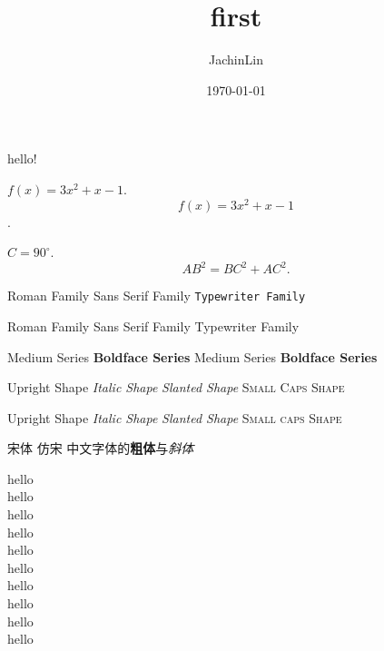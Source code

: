 \documentclass[12pt]{article} %
\title{\heiti first}
\author{\kaishu JachinLin}	%
\date{\today}
\newcommand{\degree}{^\circ}	%
\begin{document}
	\maketitle
	hello!	%

	$ f(x)=3x^2 + x - 1 $.
	$$ f(x)=3x^2 + x - 1 $$.
	
	{\par}
	
	$ C = 90\degree  $.
	\begin{equation}	%
		AB^2 = BC^2 + AC^2.
	\end{equation}
	
	{\par}
	\textrm{Roman Family}
	\textsf{Sans Serif Family}
	\texttt{Typewriter Family}
	
	{\rmfamily Roman Family}
	{\sffamily Sans Serif Family}
	{\ttfamily Typewriter Family}%
	
	\textmd{Medium Series} \textbf{Boldface Series}
	{\mdseries Medium Series} {\bfseries Boldface Series}
	
	\textup{Upright Shape} \textit{Italic Shape}
	\textsl{Slanted Shape} \textsc{Small Caps Shape}
	
	{\upshape Upright Shape} {\itshape Italic Shape}
	{\slshape Slanted Shape} {\scshape Small caps Shape}
	
	{\songti 宋体}  \quad 
	{\fangsong 仿宋} 
	中文字体的\textbf{粗体}与\textit{斜体}
	
	{\tiny hello}\\
	{\scriptsize hello}\\
	{\footnotesize hello}\\
	{\small hello}\\
	{\normalsize hello}\\
	{\large hello}\\
	{\Large hello}\\
	{\LARGE hello}\\
	{\huge hello}\\
	{\Huge hello}\\
	
	
	
	{\par}
	
	\tableofcontents
	
\end{document}
